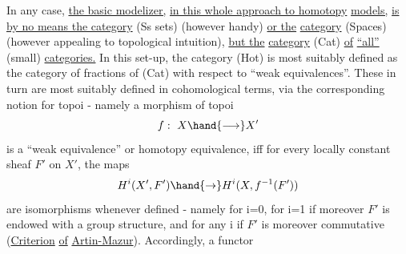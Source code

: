  In any case,  \uline{the basic modelizer,}  \uline{in this whole approach to homotopy}
\uline{models,}  \uline{is by no means the category} (Ss sets)  (however handy)  \uline{or the}
\uline{category} (Spaces)  (however appealing to topological intuition),  \uline{but the}
\uline{category} (Cat) \uline{of} \uline{``all''} (small) \uline{categories.}  In this set-up,  the category
(Hot) is most suitably defined as the category of fractions of (Cat) with
respect to ``weak equivalences''.  These in turn are most suitably defined
in cohomological terms,  via the corresponding notion for topoi  -  namely
a morphism of topoi
\[ f:\ X \hand{\longrightarrow} X' \]
is a ``weak equivalence'' or homotopy equivalence,  iff for every locally
constant sheaf $F'$ on $X'$, the maps
\[ H^{i}(X',F') \hand{\to} H^{i}(X,f^{-1}(F')) \]
are isomorphisms whenever defined  -  namely for i=0,  for i=1 if moreover
$F'$ is endowed with a group structure,  and for any i if $F'$ is moreover
commutative (\uline{Criterion} \uline{of} \uline{Artin-Mazur}).  Accordingly,  a functor
